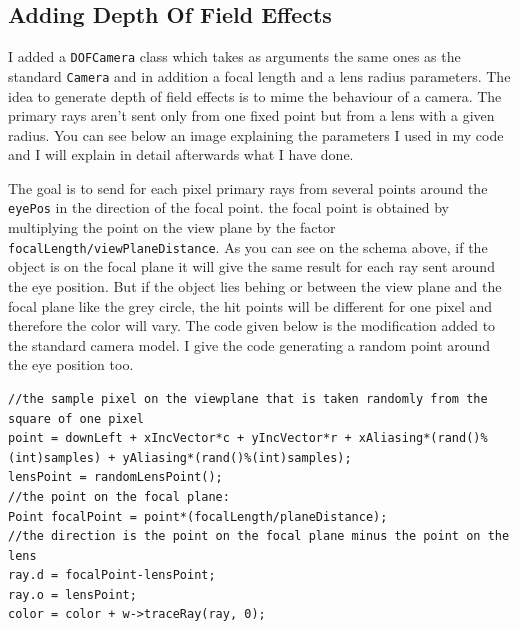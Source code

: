 \documentclass[a4paper,11.5pt]{article}
\theoremstyle{mytheor}
\begin{document}
\subsection{Adding Depth Of Field Effects}
I added a \texttt{DOFCamera} class which takes as arguments the same ones as the standard \texttt{Camera} and in addition a focal length and a lens radius parameters. The idea to generate depth of field effects is to mime the behaviour of a camera. The primary rays aren't sent only from one fixed point but from a lens with a given radius. You can see below an image explaining the parameters I used in my code and I will explain in detail afterwards what I have done. 
\begin{figure}[H]
\centering
{}
\end{figure}
The goal is to send for each pixel primary rays from several points around the \texttt{eyePos} in the direction of the focal point. the focal point is obtained by multiplying the point on the view plane by the factor \texttt{focalLength/viewPlaneDistance}. As you can see on the schema above, if the object is on the focal plane it will give the same result for each ray sent around the eye position. But if the object lies behing or between the view plane and the focal plane like the grey circle, the hit points will be different for one pixel and therefore the color will vary. The code given below is the modification added to the standard camera model. I give the code generating a random point around the eye position too. 
\clearpage
\begin{lstlisting}
//the sample pixel on the viewplane that is taken randomly from the square of one pixel
point = downLeft + xIncVector*c + yIncVector*r + xAliasing*(rand()%(int)samples) + yAliasing*(rand()%(int)samples);
lensPoint = randomLensPoint();
//the point on the focal plane:
Point focalPoint = point*(focalLength/planeDistance);
//the direction is the point on the focal plane minus the point on the lens
ray.d = focalPoint-lensPoint;
ray.o = lensPoint;
color = color + w->traceRay(ray, 0);
\end{lstlisting}
\end{document}

